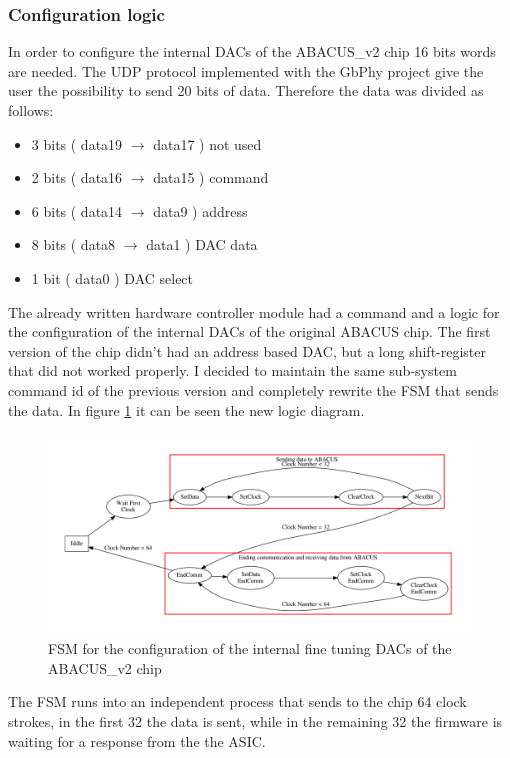\subsubsection{Configuration logic}
In order to configure the internal DACs of the ABACUS\_v2 chip 16 bits words are needed. The UDP protocol implemented with the GbPhy project give the user the possibility to send 20 bits of data.
Therefore the data was divided as follows:
\begin{itemize}
	\item 3 bits ( data19 $\rightarrow$ data17 ) not used
	\item 2 bits ( data16 $\rightarrow$ data15 ) command
	\item 6 bits ( data14 $\rightarrow$ data9 ) address
	\item 8 bits ( data8 $\rightarrow$ data1 ) DAC data
	\item 1 bit ( data0 ) DAC select
\end{itemize}
\noindent The already written hardware controller module had a command and a logic for the configuration of the internal DACs of the original ABACUS chip.
The first version of the chip didn't had an address based DAC, but a long shift-register that did not worked properly.
I decided to maintain the same sub-system command id of the previous version and completely rewrite the FSM that sends the data. 
In figure \ref{fig:fsmDACs} it can be seen the new logic diagram.
\begin{figure}[H]
	\centering
	\includegraphics[width=1.0\linewidth]{FSMdiagrams/InternalDACsFSM.pdf}
	\caption{FSM for the configuration of the internal fine tuning DACs of the ABACUS\_v2 chip}
	\label{fig:fsmDACs}
\end{figure}
\noindent The FSM runs into an independent process that sends to the chip 64 clock strokes, in the first 32 the data is sent, while in the remaining 32 the firmware is waiting for a response from the the ASIC.
